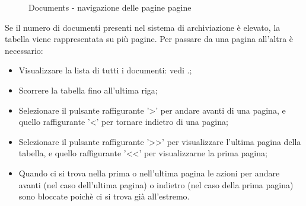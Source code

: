\documentclass[10pt, a4paper]{article}
\begin{document}
\begin{figure}[H]
    \centering  
    \caption{Documents - navigazione delle pagine pagine}
    \label{img:navpages}
\end{figure}
Se il numero di documenti presenti nel sistema di archiviazione è elevato, la tabella viene rappresentata su più pagine. Per passare da una pagina all'altra è necessario:
\begin{itemize}
    \item Visualizzare la lista di tutti i documenti: vedi .;
    \item Scorrere la tabella fino all'ultima riga;
    \item Selezionare il pulsante raffigurante '>' per andare avanti di una pagina, e quello raffigurante '<' per tornare indietro di una pagina;
    \item Selezionare il pulsante raffigurante '>>' per visualizzare l'ultima pagina della tabella, e quello raffigurante '<<' per visualizzarne la prima pagina;
    \item Quando ci si trova nella prima o nell'ultima pagina le azioni per andare avanti (nel caso dell'ultima pagina) o indietro (nel caso della prima pagina) sono bloccate poichè ci si trova già all'estremo.
\end{itemize}
\end{document}
